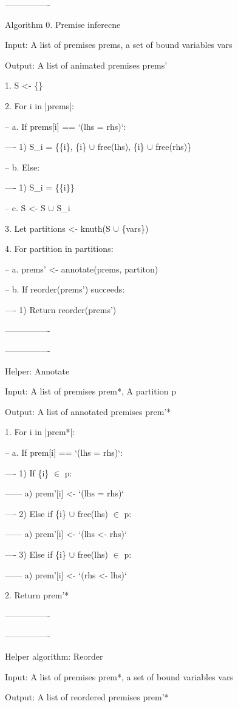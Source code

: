 ----------------

Algorithm 0. Premise inferecne

Input: A list of premises prems, a set of bound variables vars

Output: A list of animated premises prems'

1. S <- \{\}

2. For i in |prems|:

-- a. If prems[i] == `(lhs = rhs)`:

---- 1) S\_i = \{\{i\}, \{i\} $\cup$ free(lhs), \{i\} $\cup$ free(rhs)\}

-- b. Else:
    
---- 1) S\_i = \{\{i\}\}

-- c. S <- S $\cup$ S\_i

3. Let partitions <- knuth(S $\cup$ \{vars\})

4. For partition in partitions:
  
-- a. prems' <- annotate(prems, partiton)

-- b. If reorder(prems') succeeds:

---- 1) Return reorder(prems')

----------------

----------------

Helper: Annotate

Input: A list of premises prem*, A partition p

Output: A list of annotated premises prem'*

1. For i in |prem*|:

-- a. If prem[i] == `(lhs = rhs)`:

---- 1) If \{i\} $\in$ p:

------ a) prem'[i] <- `(lhs = rhs)`

---- 2) Else if \{i\} $\cup$ free(lhs) $\in$ p:

------ a) prem'[i] <- `(lhs <- rhs)`

---- 3) Else if \{i\} $\cup$ free(lhs) $\in$ p:

------ a) prem'[i] <- `(rhs <- lhs)`

2. Return prem'*

----------------

----------------

Helper algorithm: Reorder

Input: A list of premises prem*, a set of bound variables vars

Output: A list of reordered premises prem'*

